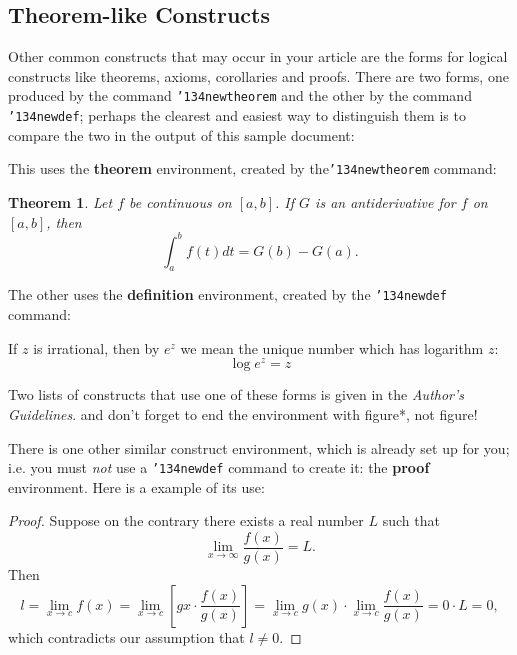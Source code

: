 \documentclass{acm_proc_article-sp}
\begin{document}
\subsection{Theorem-like Constructs}
Other common constructs that may occur in your article are
the forms for logical constructs like theorems, axioms,
corollaries and proofs.  There are
two forms, one produced by the
command \texttt{{\char'134}newtheorem} and the
other by the command \texttt{{\char'134}newdef}; perhaps
the clearest and easiest way to distinguish them is
to compare the two in the output of this sample document:

This uses the \textbf{theorem} environment, created by
the\linebreak\texttt{{\char'134}newtheorem} command:
\newtheorem{theorem}{Theorem}
\begin{theorem}
Let $f$ be continuous on $[a,b]$.  If $G$ is
an antiderivative for $f$ on $[a,b]$, then
\begin{displaymath}\int^b_af(t)dt = G(b) - G(a).\end{displaymath}
\end{theorem}

The other uses the \textbf{definition} environment, created
by the \texttt{{\char'134}newdef} command:
\begin{definition}
If $z$ is irrational, then by $e^z$ we mean the
unique number which has
logarithm $z$: \begin{displaymath}{\log e^z = z}\end{displaymath}
\end{definition}

Two lists of constructs that use one of these
forms is given in the
\textit{Author's  Guidelines}.
and don't forget to end the environment with
{figure*}, not {figure}!
 
There is one other similar construct environment, which is
already set up
for you; i.e. you must \textit{not} use
a \texttt{{\char'134}newdef} command to
create it: the \textbf{proof} environment.  Here
is a example of its use:
\begin{proof}
Suppose on the contrary there exists a real number $L$ such that
\begin{displaymath}
\lim_{x\rightarrow\infty} \frac{f(x)}{g(x)} = L.
\end{displaymath}
Then
\begin{displaymath}
l=\lim_{x\rightarrow c} f(x)
= \lim_{x\rightarrow c}
\left[ g{x} \cdot \frac{f(x)}{g(x)} \right ]
= \lim_{x\rightarrow c} g(x) \cdot \lim_{x\rightarrow c}
\frac{f(x)}{g(x)} = 0\cdot L = 0,
\end{displaymath}
which contradicts our assumption that $l\neq 0$.
\end{proof}
\end{document}
